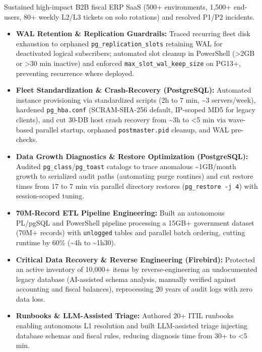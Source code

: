 \documentclass[10pt,a4paper]{article}
\begin{document}
Sustained \mbox{high-impact} B2B fiscal ERP SaaS (500+ environments, 1,500+ \mbox{end-users}, 80+ weekly \mbox{L2/L3} tickets on solo rotations) and resolved \mbox{P1/P2} incidents.
\begin{itemize}[topsep=1.5pt]
    \item \textbf{WAL Retention \& Replication Guardrails:} Traced recurring fleet disk exhaustion to orphaned \mbox{\texttt{pg\_replication\_slots}} retaining WAL for deactivated logical subscribers; automated slot cleanup in PowerShell (>2GB or >30 min inactive) and enforced \mbox{\texttt{max\_slot\_wal\_keep\_size}} on PG13+, preventing recurrence where deployed.
    \item \textbf{Fleet Standardization \& \mbox{Crash-Recovery} (PostgreSQL):} Automated instance provisioning via standardized scripts (2h to 7 min, \textasciitilde{}3 servers/week), hardened \mbox{\texttt{pg\_hba.conf}} (\mbox{SCRAM-SHA-256} default, \mbox{IP-scoped} MD5 for legacy clients), and cut \mbox{30-DB} host crash recovery from \textasciitilde{}3h to <5 min via \mbox{wave-based} parallel startup, orphaned \mbox{\texttt{postmaster.pid}} cleanup, and WAL \mbox{pre-checks}.
    \item \textbf{Data Growth Diagnostics \& Restore Optimization (PostgreSQL):} Audited \texttt{pg\_class}/\texttt{pg\_toast} catalogs to trace anomalous \textasciitilde{}1GB/month growth to serialized audit paths (automating purge routines) and cut restore times from 17 to 7 min via parallel directory restores (\mbox{\texttt{pg\_restore -j~4}}) with \mbox{session-scoped} tuning.
    \item \textbf{\mbox{70M-Record} ETL Pipeline Engineering:} Built an autonomous PL/pgSQL and PowerShell pipeline processing a 15GB+ government dataset (70M+ records) with \texttt{unlogged} tables and parallel batch ordering, cutting runtime by 60\% (\textasciitilde{}4h to \textasciitilde{}1h30).
    \item \textbf{Critical Data Recovery \& Reverse Engineering (Firebird):} Protected an active inventory of 10,000+ items by \mbox{reverse-engineering} an undocumented legacy database (\mbox{AI-assisted} schema analysis, manually verified against accounting and fiscal balances), reprocessing 20 years of audit logs with zero data loss.
    \item \textbf{Runbooks \& \mbox{LLM-Assisted} Triage:} Authored 20+ ITIL runbooks enabling autonomous L1 resolution and built \mbox{LLM-assisted} triage injecting database schemas and fiscal rules, reducing diagnosis time from 30+ to <5 min.
\end{itemize}
\end{document}
